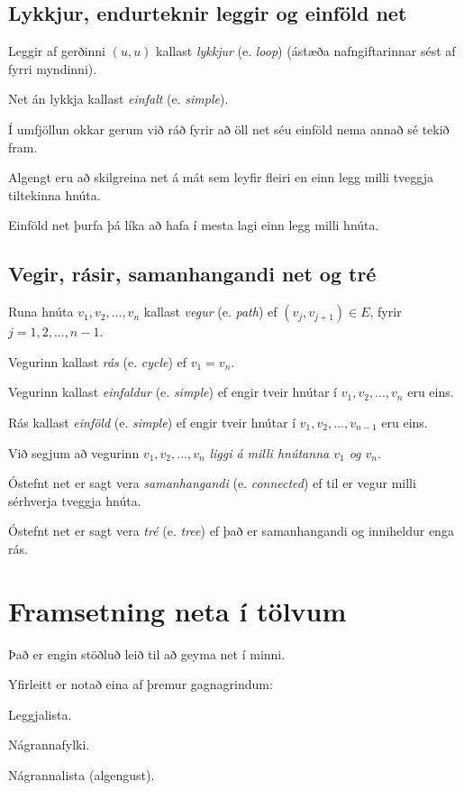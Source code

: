 \subsection{Lykkjur, endurteknir leggir og einföld net}
{
    {
        \item<1-> Leggir af gerðinni $(u, u)$ kallast \emph{lykkjur} (e. \emph{loop}) (ástæða nafngiftarinnar sést af fyrri myndinni).
        \item<2-> Net án lykkja kallast \emph{einfalt} (e. \emph{simple}).
        \item<3-> Í umfjöllun okkar gerum við ráð fyrir að öll net séu einföld nema annað sé tekið fram.
        \item<4-> Algengt eru að skilgreina net á mát sem leyfir fleiri en einn legg milli tveggja tiltekinna hnúta.
        \item<5-> Einföld net þurfa þá líka að hafa í mesta lagi einn legg milli hnúta.
    }
}

\subsection{Vegir, rásir, samanhangandi net og tré}
{
    {
        \item<1-> Runa hnúta $v_1, v_2, ..., v_n$ kallast \emph{vegur} (e. \emph{path}) ef $(v_j, v_{j + 1}) \in E$, fyrir $j = 1, 2, ..., n - 1$.
        \item<2-> Vegurinn kallast \emph{rás} (e. \emph{cycle}) ef $v_1 = v_n$.
        \item<3-> Vegurinn kallast \emph{einfaldur} (e. \emph{simple}) ef engir tveir hnútar í $v_1, v_2, ..., v_n$ eru eins.
        \item<4-> Rás kallast \emph{einföld} (e. \emph{simple}) ef engir tveir hnútar í $v_1, v_2, ..., v_{n - 1}$ eru eins.
        \item<5-> Við segjum að vegurinn $v_1, v_2, ..., v_n$ \emph{liggi á milli hnútanna $v_1$ og $v_n$}.
        \item<6-> Óstefnt net er sagt vera \emph{samanhangandi} (e. \emph{connected}) ef til er vegur milli sérhverja tveggja hnúta.
        \item<7-> Óstefnt net er sagt vera \emph{tré} (e. \emph{tree}) ef það er samanhangandi og inniheldur enga rás.
    }
}

\section{Framsetning neta í tölvum}
{
    {
        \item<1-> Það er engin stöðluð leið til að geyma net í minni.
        \item<2-> Yfirleitt er notað eina af þremur gagnagrindum:
        {
            \item<3-> Leggjalista.
            \item<4-> Nágrannafylki.
            \item<5-> Nágrannalista (algengust).
        }
    }
}

